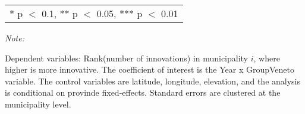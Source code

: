 \begin{table}[!h]
\begin{threeparttable}
\begin{tabular}[t]{lcccc}
\bottomrule
\multicolumn{5}{l}{\rule{0pt}{1em}* p $<$ 0.1, ** p $<$ 0.05, *** p $<$ 0.01}\\
\end{tabular}
\begin{tablenotes}[para]
\item \textit{Note: } 
\item Dependent variables: Rank(number of innovations) in municipality $i$, where higher is more innovative. The coefficient of interest is the Year x Group{Veneto} variable. The control variables are latitude, longitude, elevation, and the analysis is conditional on provinde fixed-effects. Standard errors are clustered at the municipality level.
\end{tablenotes}
\end{threeparttable}
\end{table}
